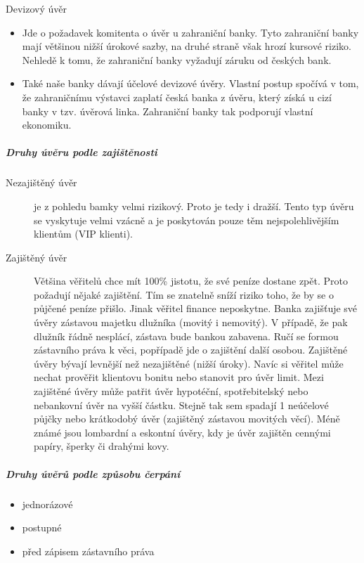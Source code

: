 Devizový úvěr
\begin{itemize}
    \item Jde o požadavek komitenta o úvěr u zahraniční banky. Tyto zahraniční banky mají většinou nižší úrokové sazby, na druhé straně však hrozí kursové riziko. Nehledě k tomu, že zahraniční banky vyžadují záruku od českých bank.
    \item Také naše banky dávají účelové devizové úvěry. Vlastní postup spočívá v tom, že zahraničnímu výstavci zaplatí česká banka z úvěru, který získá u cizí banky v tzv. úvěrová linka. Zahraniční banky tak podporují vlastní ekonomiku.
\end{itemize}

\subparagraph{Druhy úvěru podle zajištěnosti}
\begin{description}
    \item[Nezajištěný úvěr] je z pohledu bamky velmi rizikový. Proto je tedy i dražší. Tento typ úvěru se vyskytuje velmi vzácně a je poskytován pouze těm nejspolehlivějším klientům (VIP klienti).
    \item[Zajištěný úvěr] Většina věřitelů chce mít 100\% jistotu, že své peníze dostane zpět. Proto požadují nějaké zajištění. Tím se znatelně sníží riziko toho, že by se o půjčené peníze přišlo. Jinak věřitel finance neposkytne. Banka zajišťuje své úvěry zástavou majetku dlužníka (movitý i nemovitý). V případě, že pak dlužník řádně nesplácí, zástava bude bankou zabavena. Ručí se formou zástavního práva k věci, popřípadě jde o zajištění další osobou. Zajištěné úvěry bývají levnější než nezajištěné (nižší úroky). Navíc si věřitel může nechat prověřit klientovu bonitu nebo stanovit pro úvěr limit. Mezi zajištěné úvěry může patřit úvěr hypotéční, spotřebitelský nebo nebankovní úvěr na vyšší částku. Stejně tak sem spadají 1 neúčelové půjčky nebo krátkodobý úvěr (zajištěný zástavou movitých věcí). Méně známé jsou lombardní a eskontní úvěry, kdy je úvěr zajištěn cennými papíry, šperky či drahými kovy.
\end{description}

\subparagraph{Druhy úvěrů podle způsobu čerpání}
\begin{itemize}
    \item jednorázové
    \item postupné
    \item před zápisem zástavního práva
\end{itemize}

